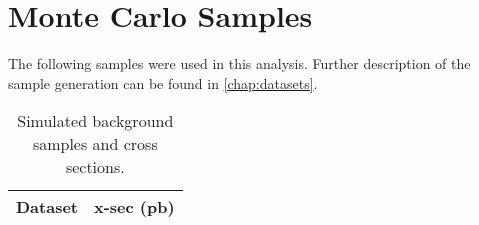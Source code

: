\chapter{Monte Carlo Samples}
\label{app:samples}
The following samples were used in this analysis. Further description of the sample generation can be found in \cref{chap:datasets}.

\begin{table}
    \caption{Simulated background samples and cross sections.}
    \begin{center}
    \begin{adjustbox}{width=\textwidth}
    \begin{tabular}{|l|l|}
        \hline

        Dataset & x-sec (pb) \\ \hline


\end{tabular}
\end{adjustbox}
\end{center}
\end{table}
